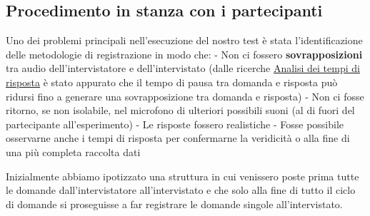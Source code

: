 \documentclass[
]{article}
\begin{document}
\subsection{Procedimento in stanza con i partecipanti}\label{procedimento-in-stanza-con-i-partecipanti}

Uno dei problemi principali nell'esecuzione del nostro test è stata l'identificazione delle metodologie di registrazione in modo che: - Non ci fossero \textbf{sovrapposizioni} tra audio dell'intervistatore e dell'intervistato (dalle ricerche \hyperref[analisi-dei-tempi-di-risposta]{Analisi dei tempi di risposta} è stato appurato che il tempo di pausa tra domanda e risposta può ridursi fino a generare una sovrapposizione tra domanda e risposta) - Non ci fosse ritorno, se non isolabile, nel microfono di ulteriori possibili suoni (al di fuori del partecipante all'esperimento) - Le risposte fossero realistiche - Fosse possibile osservarne anche i tempi di risposta per confermarne la veridicità o alla fine di una più completa raccolta dati

Inizialmente abbiamo ipotizzato una struttura in cui venissero poste prima tutte le domande dall'intervistatore all'intervistato e che solo alla fine di tutto il ciclo di domande si proseguisse a far registrare le domande singole all'intervistato.
\end{document}
